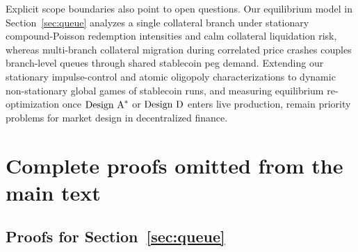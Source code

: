 Explicit scope boundaries also point to open questions. Our equilibrium model in Section~\ref{sec:queue} analyzes a single collateral branch under stationary compound-Poisson redemption intensities and calm collateral liquidation risk, whereas multi-branch collateral migration during correlated price crashes couples branch-level queues through shared stablecoin peg demand. Extending our stationary impulse-control and atomic oligopoly characterizations to dynamic non-stationary global games of stablecoin runs, and measuring equilibrium re-optimization once $\textup{Design A}^*$ or $\textup{Design D}$ enters live production, remain priority problems for market design in decentralized finance.

\appendix
\section{Complete proofs omitted from the main text}\label{app:proofs}

\subsection{Proofs for Section~\ref{sec:queue}}\label{app:proofs_queue}

